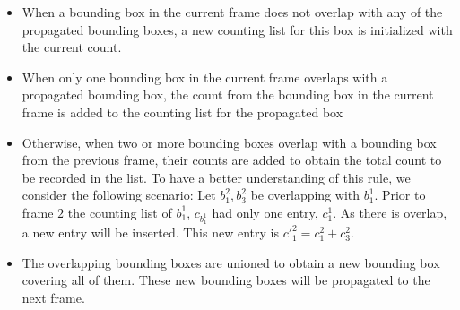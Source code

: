\begin{itemize}

\item When a bounding box in the current frame does not overlap with any of the propagated bounding boxes, a new counting list for this box is initialized with the current count.


\item When only one bounding box in the current frame overlaps with a propagated bounding box, the count from the bounding box in the current frame is added to the counting list for the propagated box

\item Otherwise, when two or more bounding boxes overlap with a bounding box from the previous frame, their counts are added to obtain the total count to be recorded in the list. To have a better understanding of this rule, we consider the following scenario: Let $b^2_1, b^2_3$ be overlapping with $b^1_1$. Prior to frame $2$ the counting list of $b^1_1$, $c_{b^1_1}$ had only one entry, $c^1_1$. As there is overlap, a new entry will be inserted. This new entry is $c'^2_1 = c^{2}_1 + c^{2}_3$.

\item The overlapping bounding boxes are unioned to obtain a new bounding box covering all of them. These new bounding boxes will be propagated to the next frame.


\end{itemize}



